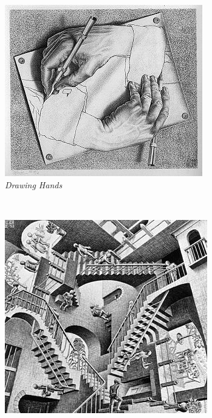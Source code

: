 \documentclass{article}
\begin{document}
\begin{figure}[h]
        \centering
        \begin{subfigure}{0.33\textwidth}
                \includegraphics[width=\textwidth]{DrawingHands}
                \caption{\textit{Drawing Hands}}
        \end{subfigure}%
       	~ 
        \begin{subfigure}{0.33\textwidth}
                \includegraphics[width=\textwidth]{Escher's_Relativity}

\end{subfigure}
\end{figure}
\end{document}
